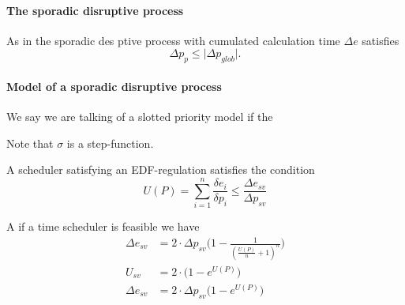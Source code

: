 	\paragraph{The sporadic disruptive process}
	\label{par:TheSporadicDisruptiveProcess}
	
	As in \cite{K} the sporadic des
	ptive process with cumulated calculation time $\Delta e$ satisfies
	\begin{equation}
	\Delta p_{p} \leq \lvert{\Delta p_{glob}} \rvert. 
	\end{equation}
	
	\paragraph{Model of a sporadic disruptive process}
	\label{par:ModelOfASporadicDisruptiveProcess}
	
	
	We say we are talking of a slotted priority model if the 
	
	\begin{remark}
	Note that $\sigma$ is a step-function. 
	\end{remark}
	
	
	\begin{remark} A scheduler satisfying an EDF-regulation satisfies the condition
		\begin{equation}
		U(P) = \sum\limits_{i=1}^n \frac{\delta e_i}{\delta p_i} \leq 		\frac{\Delta e_{sv}}{\Delta p_{sv}}
		\end{equation}
	\end{remark}
	
	\begin{theorem}
	A if a time scheduler is feasible we have
		\begin{subequations} 
		\begin{align}
		 \Delta e_{sv} &= 2 \cdot \Delta p_{sv} \Big( 1- \frac{1}{(\frac{U(P)}{
		 n}+1)^n} \Big)\\
		 U_{sv} &= 2 \cdot \Big( 1-e^{U(P)} \Big)\\
		 \Delta e_{sv} &= 2 \cdot \Delta p_{sv} \Big( 1 -e ^{U(P)} \Big) 
		\end{align}
		\end{subequations}
	\end{theorem}
	

